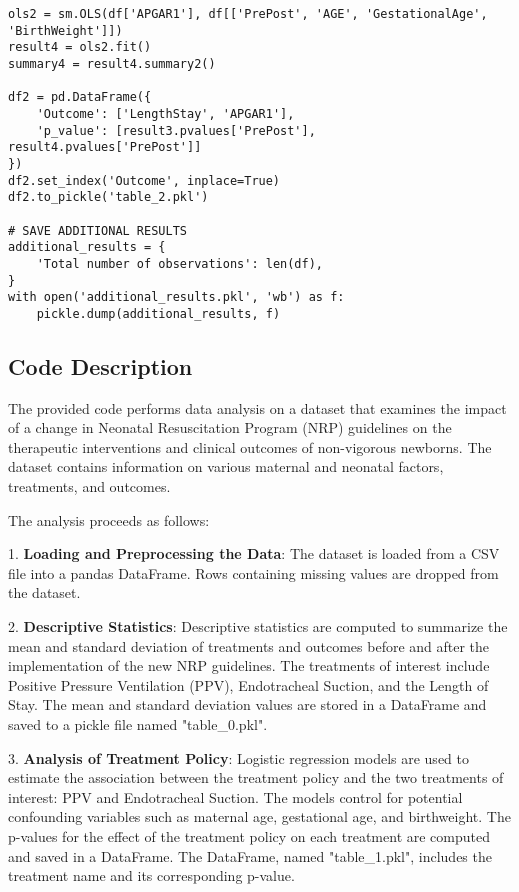 \documentclass[11pt]{article}
\begin{document}
\begin{verbatim}
ols2 = sm.OLS(df['APGAR1'], df[['PrePost', 'AGE', 'GestationalAge', 'BirthWeight']])
result4 = ols2.fit()
summary4 = result4.summary2()

df2 = pd.DataFrame({
    'Outcome': ['LengthStay', 'APGAR1'],
    'p_value': [result3.pvalues['PrePost'], result4.pvalues['PrePost']]
})
df2.set_index('Outcome', inplace=True)
df2.to_pickle('table_2.pkl')

# SAVE ADDITIONAL RESULTS
additional_results = {
    'Total number of observations': len(df),
}
with open('additional_results.pkl', 'wb') as f:
    pickle.dump(additional_results, f)

\end{verbatim}

\subsection{Code Description}

The provided code performs data analysis on a dataset that examines the impact of a change in Neonatal Resuscitation Program (NRP) guidelines on the therapeutic interventions and clinical outcomes of non-vigorous newborns. The dataset contains information on various maternal and neonatal factors, treatments, and outcomes.

The analysis proceeds as follows:

1. \textbf{Loading and Preprocessing the Data}: The dataset is loaded from a CSV file into a pandas DataFrame. Rows containing missing values are dropped from the dataset.

2. \textbf{Descriptive Statistics}: Descriptive statistics are computed to summarize the mean and standard deviation of treatments and outcomes before and after the implementation of the new NRP guidelines. The treatments of interest include Positive Pressure Ventilation (PPV), Endotracheal Suction, and the Length of Stay. The mean and standard deviation values are stored in a DataFrame and saved to a pickle file named "table\_0.pkl".

3. \textbf{Analysis of Treatment Policy}: Logistic regression models are used to estimate the association between the treatment policy and the two treatments of interest: PPV and Endotracheal Suction. The models control for potential confounding variables such as maternal age, gestational age, and birthweight. The p-values for the effect of the treatment policy on each treatment are computed and saved in a DataFrame. The DataFrame, named "table\_1.pkl", includes the treatment name and its corresponding p-value.
\end{document}

